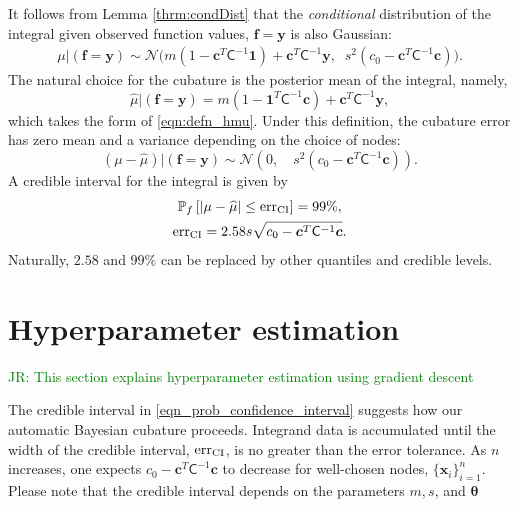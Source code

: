 \documentclass{svjour3}                     %
\newcommand{\bm}[1]{\boldsymbol{#1}}
\newcommand{\vtheta}{{\bm{\theta}}}
\newcommand{\vc}{\bm{c}}
\newcommand{\vf}{\bm{f}}
\newcommand{\vx}{\bm{x}}
\newcommand{\vy}{\bm{y}}
\newcommand{\vone}{\bm{1}}
\newcommand{\mC}{\mathsf{C}}
\newcommand{\calN}{\mathcal{N}}
\newcommand{\hmu}{\widehat{\mu}}
\newcommand{\CI}{\textup{CI}}
\newcommand{\err}{\textup{err}}
\newcommand{\JRNote}[1]{{\textcolor{green}{JR: #1}}}
\begin{document}
It follows from Lemma \ref{thrm:condDist} that the \emph{conditional} distribution of the integral given observed function values, $\vf = \vy$ is also Gaussian:
\begin{align} \label{eqn:condInteg}
\mu | (\vf = \vy) \sim \calN \bigl(m (1 - \vc^T \mC^{-1} \vone)  + \vc^T \mC^{-1} \vy, \;\;
s^2(c_0  -\vc ^T \mC^{-1} \vc) \bigr).
\end{align}
The natural choice for  the cubature is the posterior mean of the integral, namely, 
\begin{equation}
\label{eqn:BayesCub}
\widehat{\mu}  \vert ( \vf = \vy)
= m(1 - \vone^T  \mC^{-1}\vc )
+ \vc^T \mC^{-1} \vy,
\end{equation}
which takes the form of \eqref{eqn:defn_hmu}.
Under this definition, the cubature error has zero mean and a variance depending on the choice of nodes:
\begin{equation*}
(\mu-\hmu) | (\vf = \vy)
\sim  \calN 
\left(
0, \quad
s^2 (c_0 - \vc^T\mC^{-1}\vc) 
\right).
\end{equation*}
A credible interval for the integral is given by 
\begin{subequations} \label{eqn_prob_confidence_interval}
	\begin{gather}
	\mathbb{P}_f \left[
	|\mu-\hmu| \leq \err_{\CI}
	\right] = 99\%, \\
	\err_{\CI} = 2.58 s \sqrt{c_{0} - \vc^T\mC^{-1}\vc}.
	\end{gather}
\end{subequations}
Naturally, $2.58$ and $99\%$ can be replaced by other quantiles and credible levels.



















\section{Hyperparameter estimation}
\JRNote{
This section explains hyperparameter estimation using gradient descent}


The credible interval in \eqref{eqn_prob_confidence_interval} suggests how our automatic Bayesian cubature proceeds.  Integrand data is accumulated until the width of the credible interval, $\err_{\CI}$, is no greater than the error tolerance.  As $n$ increases, one expects $c_{0} - \vc^T\mC^{-1}\vc$ to decrease for well-chosen nodes, $\{\vx_i\}_{i=1}^n$. Please note that the credible interval depends on the parameters $m, s$, and $\vtheta$
\end{document}
